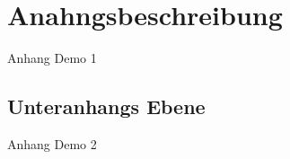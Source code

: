 \section{Anahngsbeschreibung}\label{sec:Anhang}
Anhang Demo 1
\subsection{Unteranhangs Ebene}
Anhang Demo 2
